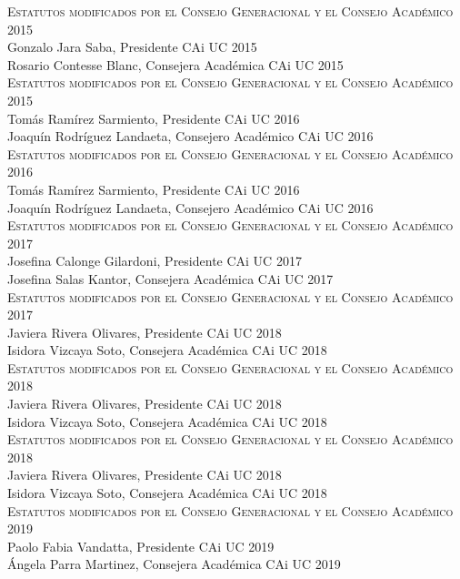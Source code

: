\documentclass[letterpaper,11pt]{article}
\theoremstyle{plain}
\begin{document}
\begin{sloppypar}
		\textsc{Estatutos modificados por el Consejo Generacional y el Consejo Académico 2015}\\
		Gonzalo Jara Saba, Presidente CAi UC 2015\\
		Rosario Contesse Blanc, Consejera Académica CAi UC 2015\\

		\textsc{Estatutos modificados por el Consejo Generacional y el Consejo Académico 2015}\\
		Tomás Ramírez Sarmiento, Presidente CAi UC 2016\\
		Joaquín Rodríguez Landaeta, Consejero Académico CAi UC 2016\\

		\textsc{Estatutos modificados por el Consejo Generacional y el Consejo Académico 2016}\\
		Tomás Ramírez Sarmiento, Presidente CAi UC 2016\\
		Joaquín Rodríguez Landaeta, Consejero Académico CAi UC 2016\\

		\textsc{Estatutos modificados por el Consejo Generacional y el Consejo Académico 2017}\\
		Josefina Calonge Gilardoni, Presidente CAi UC 2017\\
		Josefina Salas Kantor, Consejera Académica CAi UC 2017\\

		\textsc{Estatutos modificados por el Consejo Generacional y el Consejo Académico 2017}\\
		Javiera Rivera Olivares, Presidente CAi UC 2018\\
		Isidora Vizcaya Soto, Consejera Académica CAi UC 2018\\

		\textsc{Estatutos modificados por el Consejo Generacional y el Consejo Académico 2018}\\
		Javiera Rivera Olivares, Presidente CAi UC 2018\\
		Isidora Vizcaya Soto, Consejera Académica CAi UC 2018\\

		\textsc{Estatutos modificados por el Consejo Generacional y el Consejo Académico 2018}\\
		Javiera Rivera Olivares, Presidente CAi UC 2018\\
		Isidora Vizcaya Soto, Consejera Académica CAi UC 2018\\

		\textsc{Estatutos modificados por el Consejo Generacional y el Consejo Académico 2019}\\
		Paolo Fabia Vandatta, Presidente CAi UC 2019\\
		Ángela Parra Martinez, Consejera Académica CAi UC 2019\\

	\end{sloppypar}
\end{document}

